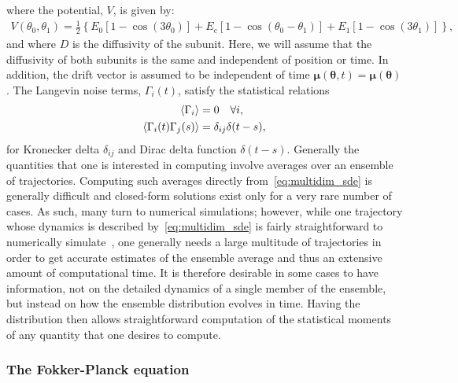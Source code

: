 \documentclass[11pt]{article}
\begin{document}
where the potential, $V$, is given by:
\begin{align}
    V(\theta_{0},\theta_{1}) = \frac{1}{2}\left\{E_{0}\left[1-\cos(3\theta_{0})\right]+E_{\mathrm{c}}\left[1-\cos(\theta_{0}-\theta_{1})\right] + E_{1}\left[1-\cos(3\theta_{1})\right]\right\},\label{eq:potential}
\end{align}
and where $D$ is the diffusivity of the subunit. Here, we will assume that the diffusivity of both subunits is the same and independent of position or time. In addition, the drift vector is assumed to be independent of time $\bm{\mu}(\bm{\theta},t) = \bm{\mu}(\bm{\theta})$. The Langevin noise terms, $\Gamma_{i}(t)$, satisfy the statistical relations
\begin{subequations}
    \begin{align}
        \ev{\Gamma_{i}} &= 0\quad \forall i,\\
        \ev{\Gamma_{i}(t)\Gamma_{j}(s)} &= \delta_{ij}\delta(t-s),
    \end{align}
\end{subequations}
for Kronecker delta $\delta_{ij}$ and Dirac delta function $\delta(t-s)$. Generally the quantities that one is interested in computing involve averages over an ensemble of trajectories. Computing such averages directly from~\eqref{eq:multidim_sde} is generally difficult and closed-form solutions exist only for a very rare number of cases. As such, many turn to numerical simulations; however, while one trajectory whose dynamics is described by~\eqref{eq:multidim_sde} is fairly straightforward to numerically simulate~\cite{kloeden1992}, one generally needs a large multitude of trajectories in order to get accurate estimates of the ensemble average and thus an extensive amount of computational time. It is therefore desirable in some cases to have information, not on the detailed dynamics of a single member of the ensemble, but instead on how the ensemble distribution evolves in time. Having the distribution then allows straightforward computation of the statistical moments of any quantity that one desires to compute.

\subsubsection{The Fokker-Planck equation}
\end{document}
